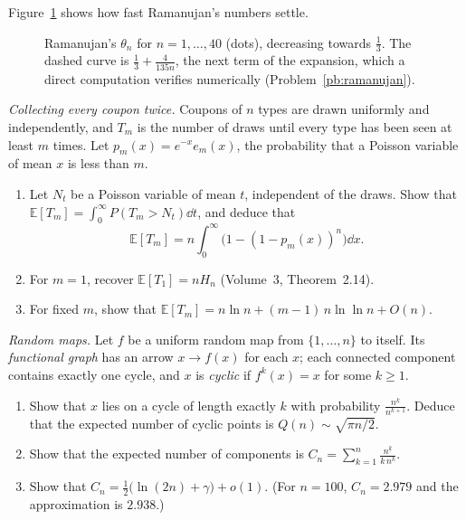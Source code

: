 Figure~\ref{fig:theta} shows how fast Ramanujan's numbers settle.

\begin{figure}[ht]
\centering
{}
\caption{Ramanujan's $\theta_n$ for $n=1,\dots,40$ (dots), decreasing towards $\frac13$. The dashed curve is $\frac13+\frac4{135n}$, the next term of the expansion,
which a direct computation verifies numerically (Problem~\ref{pb:ramanujan}).}
\label{fig:theta}
\end{figure}

\begin{exercise}[$\star\star\star$]\label{pb:dixie}
\emph{Collecting every coupon twice.} Coupons of $n$ types are drawn uniformly and independently, and $T_m$ is the number of draws until
every type has been seen at least $m$ times. Let $p_m(x)=e^{-x}e_m(x)$, the probability that a Poisson variable of mean $x$ is less than $m$.
\begin{enumerate}[label=(\alph*)]
\item Let $N_t$ be a Poisson variable of mean $t$, independent of the draws. Show that $\mathbb E[T_m]=\int_0^\infty P(T_m>N_t)\dd t$, and deduce that
\[
\mathbb E[T_m]=n\int_0^\infty\bigl(1-(1-p_m(x))^n\bigr)\dd x.
\]
\item For $m=1$, recover $\mathbb E[T_1]=nH_n$ (Volume~3, Theorem~2.14).
\item For fixed $m$, show that $\mathbb E[T_m]=n\ln n+(m-1)\,n\ln\ln n+O(n)$.
\end{enumerate}
\end{exercise}

\begin{exercise}[$\star\star$]\label{pb:mappings}
\emph{Random maps.} Let $f$ be a uniform random map from $\{1,\dots,n\}$ to itself. Its \emph{functional graph} has an arrow $x\to f(x)$ for each $x$;
each connected component contains exactly one cycle, and $x$ is \emph{cyclic} if $f^k(x)=x$ for some $k\ge1$.
\begin{enumerate}[label=(\alph*)]
\item Show that $x$ lies on a cycle of length exactly $k$ with probability $\frac{n^{\underline k}}{n^{k+1}}$. Deduce that the expected number of cyclic points is
$Q(n)\sim\sqrt{\pi n/2}$.
\item Show that the expected number of components is $C_n=\sum_{k=1}^n\frac{n^{\underline k}}{k\,n^k}$.
\item Show that $C_n=\frac12\bigl(\ln(2n)+\gamma\bigr)+o(1)$. (For $n=100$, $C_n=2.979$ and the approximation is $2.938$.)
\end{enumerate}
\end{exercise}

